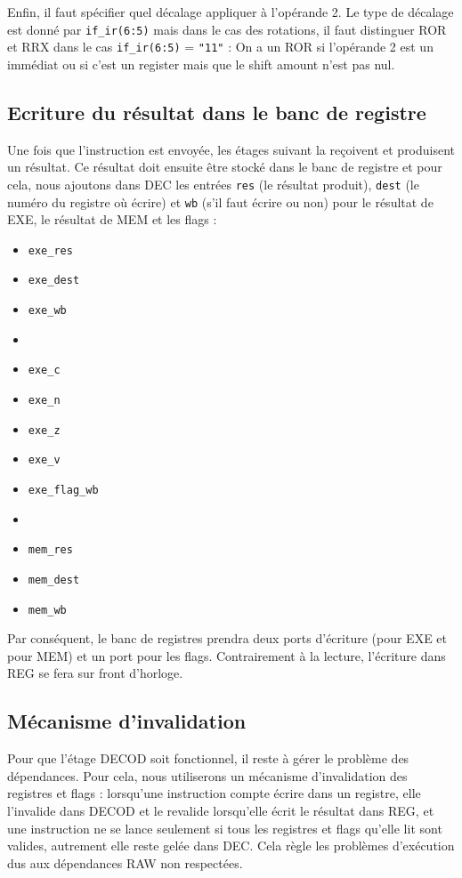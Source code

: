 \documentclass{article}
\begin{document}
Enfin, il faut spécifier quel décalage appliquer à l'opérande 2.
Le type de décalage est donné par \texttt{if\_ir(6:5)} mais dans le cas des rotations,
il faut distinguer ROR et RRX dans le cas \texttt{if\_ir(6:5)} = \texttt{"11"} :
On a un ROR si l'opérande 2 est un immédiat ou si c'est un register mais que le shift amount n'est pas nul.

\subsection{Ecriture du résultat dans le banc de registre}

Une fois que l'instruction est envoyée, les étages suivant la reçoivent et produisent un résultat.
Ce résultat doit ensuite être stocké dans le banc de registre et pour cela, nous ajoutons dans DEC
les entrées \texttt{res} (le résultat produit), \texttt{dest} (le numéro du registre où écrire)
et \texttt{wb} (s'il faut écrire
ou non) pour le résultat de EXE, le résultat de MEM et les flags :

\begin{itemize}
 \item \texttt{exe\_res}
 \item \texttt{exe\_dest}
 \item \texttt{exe\_wb}
 \item
 \item \texttt{exe\_c}
 \item \texttt{exe\_n}
 \item \texttt{exe\_z}
 \item \texttt{exe\_v}
 \item \texttt{exe\_flag\_wb}
 \item
 \item \texttt{mem\_res}
 \item \texttt{mem\_dest}
 \item \texttt{mem\_wb}
\end{itemize}

Par conséquent, le banc de registres prendra deux ports d'écriture (pour EXE et pour MEM)
et un port pour les flags. Contrairement à la lecture, l'écriture dans REG se fera sur front d'horloge.

\subsection{Mécanisme d'invalidation}

Pour que l'étage DECOD soit fonctionnel, il reste à gérer le problème des dépendances.
Pour cela, nous utiliserons un mécanisme d'invalidation des registres et flags :
lorsqu'une instruction compte écrire dans un registre, elle l'invalide dans DECOD
et le revalide lorsqu'elle écrit le résultat dans REG, et une instruction ne se lance
seulement si tous les registres et flags qu'elle lit sont valides, autrement elle reste gelée dans DEC.
Cela règle les problèmes d'exécution dus aux dépendances RAW non respectées.
\end{document}
